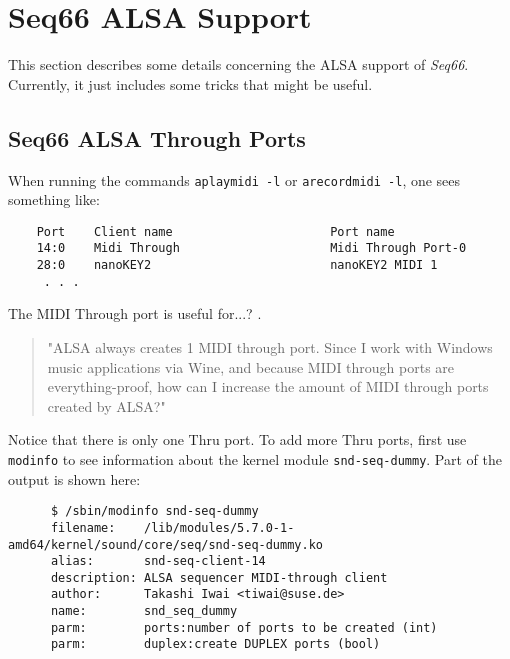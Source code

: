 %
%
%

\section{Seq66 ALSA Support}
\label{sec:alsa}

   This section describes some details concerning the ALSA support of
   \textsl{Seq66}.
   Currently, it just includes some tricks that might be useful.

\subsection{Seq66 ALSA Through Ports}
\label{subsec:alsa_through_ports}

   When running the commands \texttt{aplaymidi -l} or \texttt{arecordmidi -l},
   one sees something like:

   \begin{verbatim}
    Port    Client name                      Port name
    14:0    Midi Through                     Midi Through Port-0
    28:0    nanoKEY2                         nanoKEY2 MIDI 1
     . . .
   \end{verbatim}

   The MIDI Through port is useful for...? \cite{alsathru}.

   \begin{quote}
   "ALSA always creates 1 MIDI through port. Since I work with Windows music
   applications via Wine, and because MIDI through ports are everything-proof,
   how can I increase the amount of MIDI through ports created by ALSA?"
   \end{quote}

   Notice that there is only one Thru port.
   To add more Thru ports, first use \texttt{modinfo} to see information about
   the kernel module \texttt{snd-seq-dummy}.  Part of the output is shown here:

   \begin{verbatim}
      $ /sbin/modinfo snd-seq-dummy
      filename:    /lib/modules/5.7.0-1-amd64/kernel/sound/core/seq/snd-seq-dummy.ko
      alias:       snd-seq-client-14
      description: ALSA sequencer MIDI-through client
      author:      Takashi Iwai <tiwai@suse.de>
      name:        snd_seq_dummy
      parm:        ports:number of ports to be created (int)
      parm:        duplex:create DUPLEX ports (bool)
   \end{verbatim}

